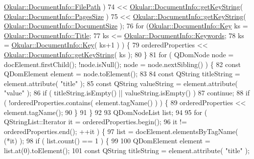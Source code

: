 \begin{DoxyCode}
{      \hyperlink{classOkular_1_1DocumentInfo_a3a6e5f7fb246e29bcb2e830b6f770791a7b8cead9bd84a1c0397d9f56daf0925f}{Okular::DocumentInfo::FilePath} )
74                     << \hyperlink{classOkular_1_1DocumentInfo_a70cb5aa15e85e1690c7793ee9f4832b2}{Okular::DocumentInfo::getKeyString}( 
      \hyperlink{classOkular_1_1DocumentInfo_a3a6e5f7fb246e29bcb2e830b6f770791a81f3995418922c0bc020a9a578a3699e}{Okular::DocumentInfo::PagesSize} )
75                     << \hyperlink{classOkular_1_1DocumentInfo_a70cb5aa15e85e1690c7793ee9f4832b2}{Okular::DocumentInfo::getKeyString}( 
      \hyperlink{classOkular_1_1DocumentInfo_a3a6e5f7fb246e29bcb2e830b6f770791ac687d1236964fde6c969f511281feaf1}{Okular::DocumentInfo::DocumentSize} );
76   \textcolor{keywordflow}{for} (\hyperlink{classOkular_1_1DocumentInfo_a3a6e5f7fb246e29bcb2e830b6f770791}{Okular::DocumentInfo::Key} ks = 
      \hyperlink{classOkular_1_1DocumentInfo_a3a6e5f7fb246e29bcb2e830b6f770791ae400626d63f14b61c55bd22aca9481e0}{Okular::DocumentInfo::Title}; 
77           ks <= \hyperlink{classOkular_1_1DocumentInfo_a3a6e5f7fb246e29bcb2e830b6f770791a833799005454e6c7e389dcceddd42b19}{Okular::DocumentInfo::Keywords}; 
78           ks = \hyperlink{classOkular_1_1DocumentInfo_a3a6e5f7fb246e29bcb2e830b6f770791}{Okular::DocumentInfo::Key}( ks+1 ) ) \{
79       orderedProperties << \hyperlink{classOkular_1_1DocumentInfo_a70cb5aa15e85e1690c7793ee9f4832b2}{Okular::DocumentInfo::getKeyString}( ks );
80   \}
81   \textcolor{keywordflow}{for} ( QDomNode node = docElement.firstChild(); !node.isNull(); node = node.nextSibling() ) \{
82     \textcolor{keyword}{const} QDomElement element = node.toElement();
83 
84     \textcolor{keyword}{const} QString titleString = element.attribute( \textcolor{stringliteral}{"title"} );
85     \textcolor{keyword}{const} QString valueString = element.attribute( \textcolor{stringliteral}{"value"} );
86     \textcolor{keywordflow}{if} ( titleString.isEmpty() || valueString.isEmpty() )
87         \textcolor{keywordflow}{continue};
88     \textcolor{keywordflow}{if} ( !orderedProperties.contains( element.tagName() ) ) \{
89         orderedProperties << element.tagName();
90     \}
91   \}
92 
93   QDomNodeList list;
94   
95   \textcolor{keywordflow}{for} ( QStringList::Iterator it = orderedProperties.begin(); 
96           it != orderedProperties.end(); ++it ) \{
97       list = docElement.elementsByTagName( (*it) );
98       \textcolor{keywordflow}{if} ( list.count() == 1 ) \{
99 
100         QDomElement element = list.at(0).toElement();
101         \textcolor{keyword}{const} QString titleString = element.attribute( \textcolor{stringliteral}{"title"} );
}
\end{DoxyCode}
